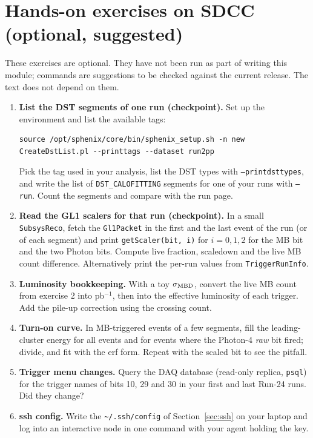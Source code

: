 \documentclass[11pt,letterpaper]{article}
\newcommand{\code}[1]{\texttt{#1}}
\begin{document}
\section{Hands-on exercises on SDCC (optional, suggested)}
These exercises are optional. They have not been run as part of writing this module; commands are suggestions to be checked against the current release. The text does not depend on them.
\begin{enumerate}
\item \textbf{List the DST segments of one run (checkpoint).} Set up the environment and list the available tags:
\begin{verbatim}
source /opt/sphenix/core/bin/sphenix_setup.sh -n new
CreateDstList.pl --printtags --dataset run2pp
\end{verbatim}
Pick the tag used in your analysis, list the DST types with \code{--printdsttypes}, and write the list of \code{DST\_CALOFITTING} segments for one of your runs with \code{--run}. Count the segments and compare with the run page.
\item \textbf{Read the GL1 scalers for that run (checkpoint).} In a small \code{SubsysReco}, fetch the \code{Gl1Packet} in the first and the last event of the run (or of each segment) and print \code{getScaler(bit, i)} for $i=0,1,2$ for the MB bit and the two Photon bits. Compute live fraction, scaledown and the live MB count difference. Alternatively print the per-run values from \code{TriggerRunInfo}.
\item \textbf{Luminosity bookkeeping.} With a toy $\sigma_{\rm MBD}$, convert the live MB count from exercise 2 into pb$^{-1}$, then into the effective luminosity of each trigger. Add the pile-up correction using the crossing count.
\item \textbf{Turn-on curve.} In MB-triggered events of a few segments, fill the leading-cluster energy for all events and for events where the Photon-4 \emph{raw} bit fired; divide, and fit with the erf form. Repeat with the scaled bit to see the pitfall.
\item \textbf{Trigger menu changes.} Query the DAQ database (read-only replica, \code{psql}) for the trigger names of bits 10, 29 and 30 in your first and last Run-24 runs. Did they change?
\item \textbf{ssh config.} Write the \code{\textasciitilde/.ssh/config} of Section~\ref{sec:ssh} on your laptop and log into an interactive node in one command with your agent holding the key.
\end{enumerate}
\end{document}

